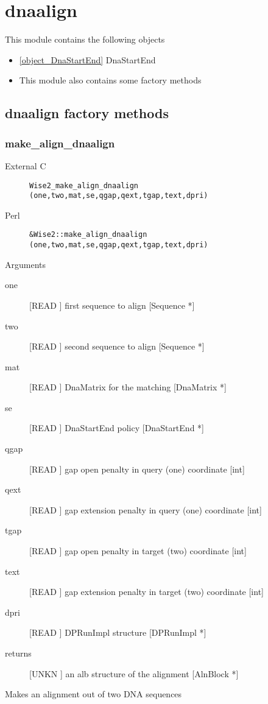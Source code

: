 \section{dnaalign}
\label{module_dnaalign}
This module contains the following objects

\begin{itemize}
\item \ref{object_DnaStartEnd} DnaStartEnd

\item This module also contains some factory methods
\end{itemize}
\subsection{dnaalign factory methods}
\subsubsection{make_align_dnaalign}
\begin{description}
\item[External C] {\tt Wise2_make_align_dnaalign (one,two,mat,se,qgap,qext,tgap,text,dpri)}
\item[Perl] {\tt &Wise2::make_align_dnaalign (one,two,mat,se,qgap,qext,tgap,text,dpri)}

\end{description}
Arguments
\begin{description}
\item[one] [READ ] first sequence to align [Sequence *]
\item[two] [READ ] second sequence to align [Sequence *]
\item[mat] [READ ] DnaMatrix for the matching [DnaMatrix *]
\item[se] [READ ] DnaStartEnd policy [DnaStartEnd *]
\item[qgap] [READ ] gap open penalty in query (one) coordinate [int]
\item[qext] [READ ] gap extension penalty in query (one) coordinate [int]
\item[tgap] [READ ] gap open penalty in target (two) coordinate [int]
\item[text] [READ ] gap extension penalty in target (two) coordinate [int]
\item[dpri] [READ ] DPRunImpl structure [DPRunImpl *]
\item[returns] [UNKN ] an alb structure of the alignment [AlnBlock *]
\end{description}
Makes an alignment out of two DNA sequences


